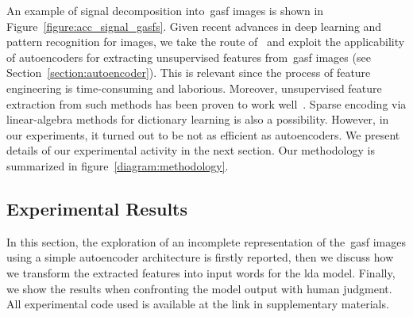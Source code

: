 An example of signal decomposition into~\gls{gasf} images is shown in Figure~\ref{figure:acc_signal_gasfs}. Given recent advances in deep learning and pattern recognition for images, we take the route of~\cite{wang_encoding_2015} and exploit the applicability of autoencoders for extracting unsupervised features from~\gls{gasf} images (see Section~\ref{section:autoencoder}). This is relevant since the process of feature engineering is time-consuming and laborious. Moreover, unsupervised feature extraction from such methods has been proven to work well~\cite{wang_imaging_2015, wang_time_2016}.
Sparse encoding via linear-algebra methods for dictionary learning is also a possibility. However, in our experiments, it turned out to be not as efficient as autoencoders. We present details of our experimental activity in the next section. Our methodology is summarized in figure~\ref{diagram:methodology}.

%
%

\subsection{Experimental Results}
In this section, the exploration of an incomplete representation of the~\gls{gasf} images using a simple autoencoder architecture is firstly reported, then we discuss how we transform the extracted features into input words for the \gls{lda} model. Finally, we show the results when confronting the model output with human judgment. All experimental code used is available at the link in supplementary materials. %

